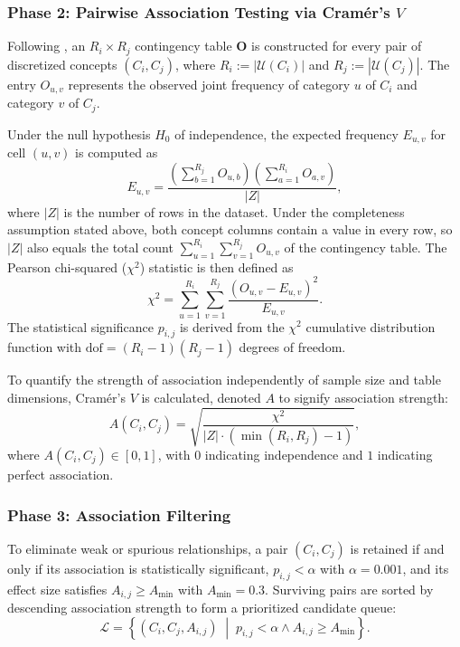 \subsubsection{Phase 2: Pairwise Association Testing via Cramér's $V$}

Following \cite{ben-shacharPhiFeiFo2023}, an $R_i \times R_j$ contingency table $\mathbf{O}$ is constructed for every pair of discretized concepts $(C_i, C_j)$, where $R_i := |\mathcal{U}(C_i)|$ and $R_j := |\mathcal{U}(C_j)|$. The entry $O_{u,v}$ represents the observed joint frequency of category $u$ of $C_i$ and category $v$ of $C_j$.

Under the null hypothesis $H_0$ of independence, the expected frequency $E_{u,v}$ for cell $(u,v)$ is computed as
\begin{equation}
	E_{u,v} = \frac{\left( \sum_{b=1}^{R_j} O_{u,b} \right) \left( \sum_{a=1}^{R_i} O_{a,v} \right)}{|Z|},
\end{equation}
where $|Z|$ is the number of rows in the dataset. Under the completeness assumption stated above, both concept columns contain a value in every row, so $|Z|$ also equals the total count $\sum_{u=1}^{R_i}\sum_{v=1}^{R_j}O_{u,v}$ of the contingency table. The Pearson chi-squared ($\chi^2$) statistic is then defined as
\begin{equation}
	\chi^2 = \sum_{u=1}^{R_i} \sum_{v=1}^{R_j} \frac{(O_{u,v} - E_{u,v})^2}{E_{u,v}}.
\end{equation}
The statistical significance $p_{i,j}$ is derived from the $\chi^2$ cumulative distribution function with $\text{dof} = (R_i - 1)(R_j - 1)$ degrees of freedom.

To quantify the strength of association independently of sample size and table dimensions, Cramér's $V$ is calculated, denoted $A$ to signify association strength:
\begin{equation}
	A(C_i, C_j) = \sqrt{\frac{\chi^2}{|Z| \cdot (\min(R_i, R_j) - 1)}},
\end{equation}
where $A(C_i, C_j) \in [0, 1]$, with $0$ indicating independence and $1$ indicating perfect association.

\subsubsection{Phase 3: Association Filtering}

To eliminate weak or spurious relationships, a pair $(C_i, C_j)$ is retained if and only if its association is statistically significant, $p_{i,j} < \alpha$ with $\alpha = 0.001$, and its effect size satisfies $A_{i,j} \ge A_{\min}$ with $A_{\min} = 0.3$.
Surviving pairs are sorted by descending association strength to form a prioritized candidate queue:
\begin{equation}
	\mathcal{L} = \left\{ (C_i, C_j, A_{i,j}) \;\middle|\; p_{i,j} < \alpha \land A_{i,j} \ge A_{\min} \right\}.
\end{equation}


